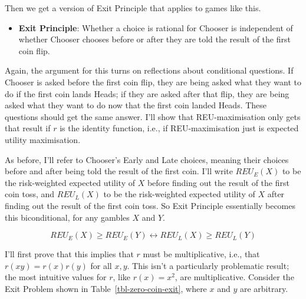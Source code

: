 \documentclass[
  12pt,
  letterpaper,
  DIV=11,
  numbers=noendperiod]{scrreprt}
\providecommand{\tightlist}{%
  \setlength{\itemsep}{0pt}\setlength{\parskip}{0pt}}\usepackage{longtable,booktabs,array}
\begin{document}
Then we get a version of Exit Principle that applies to games like this.

\begin{itemize}
\tightlist
\item
  \textbf{Exit Principle}: Whether a choice is rational for Chooser is
  independent of whether Chooser chooses before or after they are told
  the result of the first coin flip.
\end{itemize}

Again, the argument for this turns on reflections about conditional
questions. If Chooser is asked before the first coin flip, they are
being asked what they want to do if the first coin lands Heads; if they
are asked after that flip, they are being asked what they want to do now
that the first coin landed Heads. These questions should get the same
answer. I'll show that REU-maximisation only gets that result if \(r\)
is the identity function, i.e., if REU-maximisation just is expected
utility maximisation.

As before, I'll refer to Chooser's Early and Late choices, meaning their
choices before and after being told the result of the first coin. I'll
write \(REU_E(X)\) to be the risk-weighted expected utility of \(X\)
before finding out the result of the first coin toss, and \(REU_L(X)\)
to be the risk-weighted expected utility of \(X\) after finding out the
result of the first coin toss. So Exit Principle essentially becomes
this biconditional, for any gambles \(X\) and \(Y\).

\[
REU_E(X) \geq REU_E(Y) \leftrightarrow REU_L(X) \geq REU_L(Y)
\]

I'll first prove that this implies that \(r\) must be multiplicative,
i.e., that \(r(xy) = r(x)r(y)\) for all \(x, y\). This isn't a
particularly problematic result; the most intuitive values for \(r\),
like \(r(x) = x^2\), are multiplicative. Consider the Exit Problem shown
in Table~\ref{tbl-zero-coin-exit}, where \(x\) and \(y\) are arbitrary.
\end{document}
